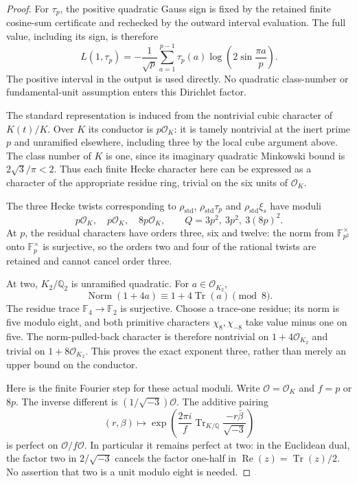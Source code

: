 \begin{proof}
For $\tau_p$, the positive quadratic Gauss sign is fixed by the
retained finite cosine-sum certificate and rechecked by the
outward interval evaluation.
The full value, including its sign, is therefore
\[
 L(1,\tau_p)=-\frac1{\sqrt p}
       \sum_{a=1}^{p-1}\tau_p(a)
                      \log\left(2\sin\frac{\pi a}{p}\right).
 \tag{Q8QC.20}
\]
The positive interval in the output is used directly.
No quadratic class-number or fundamental-unit assumption enters
this Dirichlet factor.

The standard representation is induced from the nontrivial cubic
character of $K(t)/K$.
Over $K$ its conductor is $p\mathcal O_K$: it is tamely nontrivial
at the inert prime $p$ and unramified elsewhere, including three
by the local cube argument above.
The class number of $K$ is one, since its imaginary quadratic
Minkowski bound is $2\sqrt3/\pi<2$.
Thus each finite Hecke character here can be expressed as a
character of the appropriate residue ring, trivial on the six
units of $\mathcal O_K$.

The three Hecke twists corresponding to
$\rho_{\mathrm{std}}$, $\rho_{\mathrm{std}}\tau_p$ and
$\rho_{\mathrm{std}}\xi_s$ have moduli
\[
              p\mathcal O_K,\quad p\mathcal O_K,\quad
              8p\mathcal O_K,
 \qquad
 Q=3p^2,\ 3p^2,\ 3(8p)^2 .
 \tag{Q8QC.21}
\]
At $p$, the residual characters have orders three, six and twelve:
the norm from $\mathbb F_{p^2}^{\times}$ onto
$\mathbb F_p^\times$ is surjective, so the orders two and four
of the rational twists are retained and cannot cancel order three.

At two, $K_2/\mathbb Q_2$ is unramified quadratic.
For $a\in\mathcal O_{K_2}$,
\[
             \operatorname{Norm}(1+4a)
                         \equiv1+4\operatorname{Tr}(a)\pmod8.
 \tag{Q8QC.22}
\]
The residue trace $\mathbb F_4\to\mathbb F_2$ is surjective.
Choose a trace-one residue; its norm is five modulo eight,
and both primitive characters $\chi_8,\chi_{-8}$ take value
minus one on five.
The norm-pulled-back character is therefore nontrivial on
$1+4\mathcal O_{K_2}$ and trivial on $1+8\mathcal O_{K_2}$.
This proves the exact exponent three, rather than merely an
upper bound on the conductor.

Here is the finite Fourier step for these actual moduli.
Write $\mathcal O=\mathcal O_K$ and $f=p$ or $8p$.
The inverse different is $(1/\sqrt{-3})\mathcal O$.
The additive pairing
\[
 (r,\beta)\longmapsto
       \exp\left(\frac{2\pi i}{f}
          \operatorname{Tr}_{K/\mathbb Q}
                        \frac{-r\bar\beta}{\sqrt{-3}}\right)
 \tag{Q8QC.23}
\]
is perfect on $\mathcal O/f\mathcal O$.
In particular it remains perfect at two: in the Euclidean dual,
the factor two in $2/\sqrt{-3}$ cancels the factor one-half in
$\operatorname{Re}(z)=\operatorname{Tr}(z)/2$.
No assertion that two is a unit modulo eight is needed.


\end{proof}
